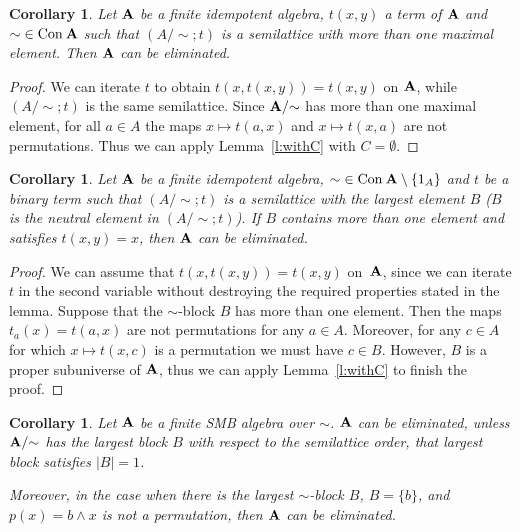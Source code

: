 \documentclass[11pt]{amsart}
\newcommand{\m}[1]{{\uppercase {\mathbf {#1}}}}
\newcommand{\con}{{\rm Con\:}}
\newcommand{\cn}[1]{{\con\m {#1}}}
\newcommand{\Cn}[1]{{{\bf\con}\m {#1}}}
\newcommand{\mt}{\wedge}
\newtheorem{cor}[thm]{Corollary}
\theoremstyle{definition}
\begin{document}
\begin{cor}
\label{c:single-maximal-block}
Let $\m a$ be a finite idempotent algebra, $t(x,y)$ a term of $\m a$ and ${\sim}\in\cn a$ such that $(A/{\sim};t)$ is a semilattice with more than one maximal element. Then $\m a$ can be eliminated.
\end{cor}

\begin{proof}
We can iterate $t$ to obtain $t(x,t(x,y)) = t(x,y)$ on $\m a$, while $(A/{\sim};t)$ is the same semilattice. Since $\m a/{\sim}$ has more than one maximal element, for all $a\in A$ the maps $x\mapsto t(a,x)$ and $x\mapsto t(x,a)$ are not permutations. Thus we can apply Lemma~\ref{l:withC} with $C=\emptyset$.
\end{proof}


\begin{cor}
\label{c:single-maximal-element}
Let $\m a$ be a finite idempotent algebra, ${\sim}\in\Cn a\setminus\{1_A\}$ and $t$ be a binary term such that $(A/{\sim};t)$ is a semilattice with the largest element $B$ ($B$ is the neutral element in $(A/{\sim};t)$). If $B$ contains more than one element and satisfies $t(x,y)=x$, then $\m a$ can be eliminated.
\end{cor}

\begin{proof}
We can assume that $t(x,t(x,y)) = t(x,y)$ on~$\m a$, since we can iterate $t$ in the second variable without destroying the required properties stated in the lemma. Suppose that the ${\sim}$-block $B$ has more than one element.
Then the maps $t_a(x) = t(a,x)$ are not permutations for any $a\in A$. Moreover, for any $c\in A$ for which $x\mapsto t(x,c)$ is a permutation we must have $c\in B$. However, $B$ is a proper subuniverse of $\m a$, thus we can apply Lemma~\ref{l:withC} to finish the proof.
\end{proof}

\begin{cor}\label{SMBeliminated}
Let $\m a$ be a finite SMB algebra over $\sim$. $\m a$ can be eliminated, unless $\m a/{\sim}$ has the largest block $B$ with respect to the semilattice order, that largest block satisfies $|B|=1$. 

Moreover, in the case when there is the largest $\sim$-block $B$, $B=\{b\}$, and $p(x)=b\mt x$ is not a permutation, then $\m a$ can be eliminated.
\end{cor}
\end{document}
